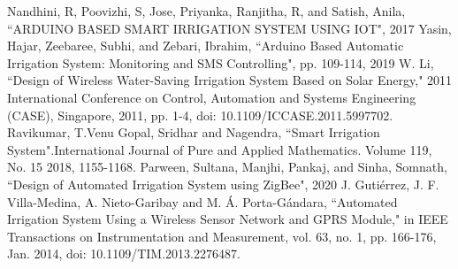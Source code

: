 \documentclass[conference]{IEEEtran}
\begin{document}
	
	\begin{thebibliography}{00}
		Nandhini, R, Poovizhi, S, Jose, Priyanka, Ranjitha, R, and Satish, Anila, ``ARDUINO BASED SMART IRRIGATION SYSTEM USING IOT", 2017
		 Yasin, Hajar, Zeebaree, Subhi, and Zebari, Ibrahim, ``Arduino Based Automatic Irrigation System: Monitoring and SMS Controlling", pp. 109-114, 2019
		W. Li, ``Design of Wireless Water-Saving Irrigation System Based on Solar Energy," 2011 International Conference on Control, Automation and Systems Engineering (CASE), Singapore, 2011, pp. 1-4, doi: 10.1109/ICCASE.2011.5997702.
		Ravikumar, T.Venu Gopal, Sridhar and Nagendra, ``Smart Irrigation System".International Journal of Pure and Applied Mathematics. Volume 119, No. 15 2018, 1155-1168.
		Parween, Sultana, Manjhi, Pankaj, and Sinha, Somnath, ``Design of Automated Irrigation System using ZigBee", 2020
		J. Gutiérrez, J. F. Villa-Medina, A. Nieto-Garibay and M. Á. Porta-Gándara, ``Automated Irrigation System Using a Wireless Sensor Network and GPRS Module," in IEEE Transactions on Instrumentation and Measurement, vol. 63, no. 1, pp. 166-176, Jan. 2014, doi: 10.1109/TIM.2013.2276487.
	\end{thebibliography}
	
\end{document}
